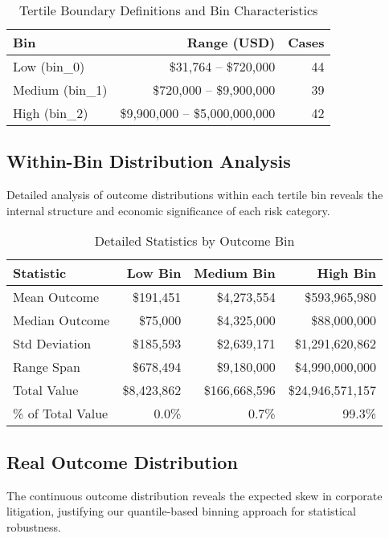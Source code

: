 \documentclass[11pt]{article}
\begin{document}
\begin{table}[H]
\centering
\caption{Tertile Boundary Definitions and Bin Characteristics}
\begin{tabular}{lrr}
\toprule
\textbf{Bin} & \textbf{Range (USD)} & \textbf{Cases} \\
\midrule
Low (bin\_0) & \$31,764 -- \$720,000 & 44 \\
Medium (bin\_1) & \$720,000 -- \$9,900,000 & 39 \\
High (bin\_2) & \$9,900,000 -- \$5,000,000,000 & 42 \\
\bottomrule
\end{tabular}
\end{table}

\subsection{Within-Bin Distribution Analysis}

Detailed analysis of outcome distributions within each tertile bin reveals the internal structure and economic significance of each risk category.

\begin{table}[H]
\centering
\caption{Detailed Statistics by Outcome Bin}
\begin{tabular}{lrrr}
\toprule
\textbf{Statistic} & \textbf{Low Bin} & \textbf{Medium Bin} & \textbf{High Bin} \\
\midrule
Mean Outcome & \$191,451 & \$4,273,554 & \$593,965,980 \\
Median Outcome & \$75,000 & \$4,325,000 & \$88,000,000 \\
Std Deviation & \$185,593 & \$2,639,171 & \$1,291,620,862 \\
Range Span & \$678,494 & \$9,180,000 & \$4,990,000,000 \\
Total Value & \$8,423,862 & \$166,668,596 & \$24,946,571,157 \\
\% of Total Value & 0.0\% & 0.7\% & 99.3\% \\
\bottomrule
\end{tabular}
\end{table}

\subsection{Real Outcome Distribution}

The continuous outcome distribution reveals the expected skew in corporate litigation, justifying our quantile-based binning approach for statistical robustness.
\end{document}
